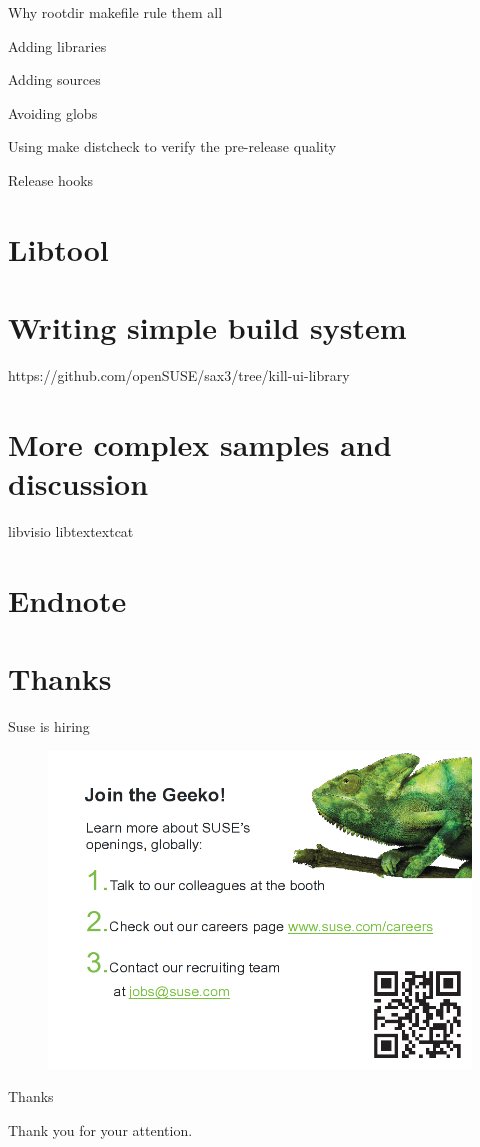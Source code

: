 \documentclass{beamer}
\begin{document}
Why rootdir makefile rule them all

Adding libraries

Adding sources

Avoiding globs

Using make distcheck to verify the pre-release quality

Release hooks

\section{Libtool}

\section{Writing simple build system}
https://github.com/openSUSE/sax3/tree/kill-ui-library

\section{More complex samples and discussion}
libvisio
libtextextcat

\section{Endnote}

\section{Thanks}

\begin{frame}{Suse is hiring}
	\begin{figure}
	\includegraphics[width= 0.8\linewidth]{suse_hiring.png}
	\end{figure}
\end{frame}

\begin{frame}{Thanks}
	\begin{center}
	Thank you for your attention.
	\end{center}
\end{frame}
\end{document}
